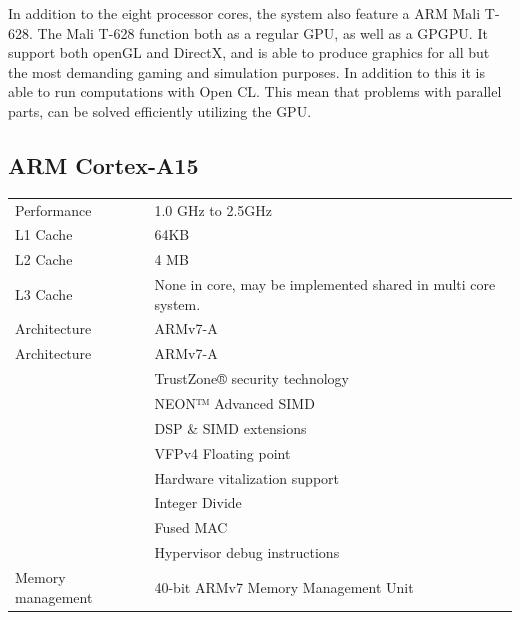 In addition to the eight processor cores, the system also feature a ARM Mali T-628.
The Mali T-628 function both as a regular GPU, as well as a GPGPU.
It support both openGL and DirectX, and is able to produce graphics for all but the most demanding gaming and simulation purposes.
In addition to this it is able to run computations with Open CL.
This mean that problems with parallel parts, can be solved efficiently utilizing the GPU.

\subsection{ARM Cortex-A15}
\begin{table}[H]
  \begin{tabular}{ll}
    Performance       & 1.0 GHz to 2.5GHz  \\
    L1 Cache          & 64KB \\
    L2 Cache          & 4 MB \\
    L3 Cache          & None in core, may be implemented shared in multi core system. \\Architecture      & ARMv7-A            \\
    Architecture      & ARMv7-A            \\
                      & TrustZone® security technology \\
                      & NEON™ Advanced SIMD \\
                      & DSP \& SIMD extensions \\
                      & VFPv4 Floating point \\
                      & Hardware vitalization support \\
                      & Integer Divide \\
                      & Fused MAC \\
                      & Hypervisor debug instructions \\
    Memory management & 40-bit ARMv7 Memory Management Unit
  \end{tabular}
\end{table}
